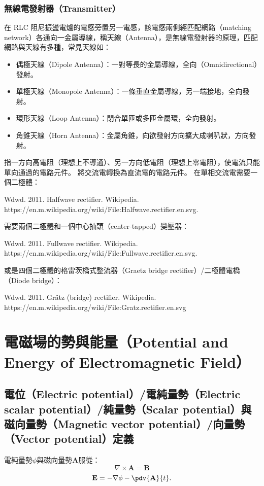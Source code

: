 \documentclass[a4paper,12pt]{report}
\begin{document}
\begin{itemize}
\subsubsection{無線電發射器（Transmitter）}
在 RLC 阻尼振盪電爐的電感旁置另一電感，該電感兩側經匹配網路（matching network）各通向一金屬導線，稱天線（Antenna），是無線電發射器的原理，匹配網路與天線有多種，常見天線如：
\begin{itemize}
\item 偶極天線（Dipole Antenna）：一對等長的金屬導線，全向（Omnidirectional）發射。
\item 單極天線（Monopole Antenna）：一條垂直金屬導線，另一端接地，全向發射。
\item 環形天線（Loop Antenna）：閉合單匝或多匝金屬環，全向發射。
\item 角錐天線（Horn Antenna）：金屬角錐，向欲發射方向擴大成喇叭狀，方向發射。
\end{itemize}
指一方向高電阻（理想上不導通）、另一方向低電阻（理想上零電阻），使電流只能單向通過的電路元件。
將交流電轉換為直流電的電路元件。
在單相交流電需要一個二極體：
\bct\bfH\ctr{}\caption{Wdwd. 2011. Halfwave rectifier. Wikipedia. https://en.m.wikipedia.org/wiki/File:Halfwave.rectifier.en.svg.}\ef\FB\ect
{}
需要兩個二極體和一個中心抽頭（center-tapped）變壓器：
\bct\bfH\ctr{}\caption{Wdwd. 2011. Fullwave rectifier. Wikipedia. https://en.m.wikipedia.org/wiki/File:Fullwave.rectifier.en.svg.}\ef\FB\ect
或是四個二極體的格雷茨橋式整流器（Graetz bridge rectifier）/二極體電橋（Diode bridge）：
\bct\bfH\ctr{}\caption{Wdwd. 2011. Grätz (bridge) rectifier. Wikipedia. https://en.m.wikipedia.org/wiki/File:Gratz.rectifier.en.svg}\ef\FB\ect



\section{電磁場的勢與能量（Potential and Energy of Electromagnetic Field）}
\subsection{電位（Electric potential）/電純量勢（Electric scalar potential）/純量勢（Scalar potential）與磁向量勢（Magnetic vector potential）/向量勢（Vector potential）定義}
電純量勢$\phi$與磁向量勢$\mathbf{A}$服從：
\[ \nabla \times \mathbf{A} = \mathbf{B}\]
\[\mathbf{E} = - \nabla \phi - \pdv{\mathbf{A} }{t}.\]

\end{itemize}
\end{document}
